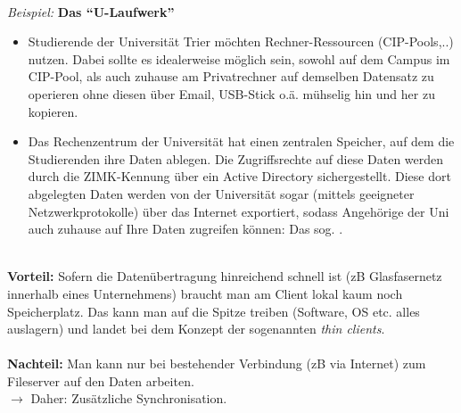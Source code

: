 ~\\
\textit{Beispiel:} \textbf{Das ``U-Laufwerk''}
\begin{itemize}
	\item Studierende der Universität Trier möchten Rechner-Ressourcen (CIP-Pools,..) nutzen. Dabei sollte es idealerweise möglich sein, sowohl auf dem Campus im CIP-Pool, als auch zuhause am Privatrechner auf demselben Datensatz zu operieren ohne diesen über Email, USB-Stick o.ä. mühselig hin und her zu kopieren.
\item Das Rechenzentrum der Universität hat einen zentralen Speicher, auf dem die Studierenden ihre Daten ablegen. Die Zugriffsrechte auf diese Daten werden durch die ZIMK-Kennung über ein Active Directory sichergestellt. Diese dort abgelegten Daten werden von der Universität sogar (mittels geeigneter Netzwerkprotokolle) über das Internet exportiert, sodass Angehörige der Uni auch zuhause auf Ihre Daten zugreifen können: Das sog. .
\end{itemize}
~\\
\textbf{Vorteil:} Sofern die Datenübertragung hinreichend schnell ist (zB Glasfasernetz innerhalb eines Unternehmens) braucht man am Client lokal kaum noch Speicherplatz. Das kann man auf die Spitze treiben (Software, OS etc. alles auslagern) und landet bei dem Konzept der sogenannten \textit{thin clients}.\\~\\
\textbf{Nachteil:} Man kann nur bei bestehender Verbindung (zB via Internet) zum Fileserver auf den Daten arbeiten.\\ $\to$ Daher: Zusätzliche Synchronisation.\\
